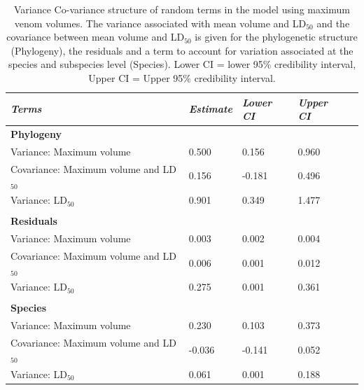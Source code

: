 \begin{table}[H]
  \centering
    \caption[ ]{Variance Co-variance structure of random terms in the model using maximum venom volumes. The variance associated with mean volume and LD$_{50}$ and the covariance between mean volume and LD$_{50}$ is given for the phylogenetic structure (Phylogeny), the residuals and a term to account for variation associated at the species and subspecies level (Species). Lower CI = lower 95\% credibility interval, Upper CI = Upper 95\% credibility interval.}
\begin{tabular}{*5l}    \toprule
\emph{Terms} & \emph{Estimate} & \emph{Lower CI} & \emph{Upper CI}\\\midrule
\textbf{Phylogeny} &   &   &  \\ 
Variance: Maximum volume & 0.500 & 0.156 & 0.960 \\
Covariance: Maximum volume and LD$_{50}$ & 0.156  &  -0.181  & 0.496 \\
Variance: LD$_{50}$ & 0.901 & 0.349 & 1.477 \\

 &   &   &  \\

\textbf{Residuals} &   &   &  \\ 
Variance: Maximum volume & 0.003 & 0.002 & 0.004 \\
Covariance: Maximum volume and LD$_{50}$ & 0.006  & 0.001  & 0.012 \\
Variance: LD$_{50}$ & 0.275 & 0.001 & 0.361 \\

 &   &   &  \\ 

\textbf{Species} &   &   &  \\ 
Variance: Maximum volume & 0.230 & 0.103 & 0.373 \\
Covariance: Maximum volume and LD$_{50}$ &  -0.036  &  -0.141  & 0.052 \\
Variance: LD$_{50}$ & 0.061 & 0.001 & 0.188 \\\bottomrule
 \hline
\end{tabular}
  \label{tbl:Table 4.4.}
\end{table}


